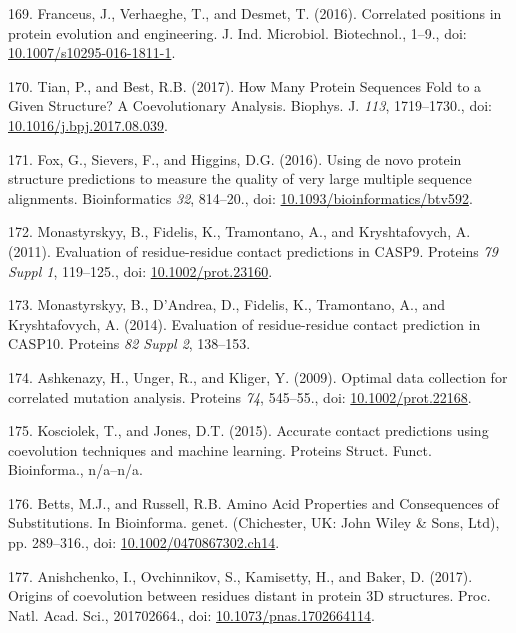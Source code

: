 \documentclass[11pt,a4paper,twoside]{book}
\theoremstyle{definition}
\theoremstyle{definition}
\theoremstyle{remark}
\begin{document}
\hypertarget{ref-Franceus2016}{}
169. Franceus, J., Verhaeghe, T., and Desmet, T. (2016). Correlated
positions in protein evolution and engineering. J. Ind. Microbiol.
Biotechnol., 1--9., doi:
\href{https://doi.org/10.1007/s10295-016-1811-1}{10.1007/s10295-016-1811-1}.

\hypertarget{ref-Tian2017}{}
170. Tian, P., and Best, R.B. (2017). How Many Protein Sequences Fold to
a Given Structure? A Coevolutionary Analysis. Biophys. J. \emph{113},
1719--1730., doi:
\href{https://doi.org/10.1016/j.bpj.2017.08.039}{10.1016/j.bpj.2017.08.039}.

\hypertarget{ref-Fox2016}{}
171. Fox, G., Sievers, F., and Higgins, D.G. (2016). Using de novo
protein structure predictions to measure the quality of very large
multiple sequence alignments. Bioinformatics \emph{32}, 814--20., doi:
\href{https://doi.org/10.1093/bioinformatics/btv592}{10.1093/bioinformatics/btv592}.

\hypertarget{ref-Monastyrskyy2011}{}
172. Monastyrskyy, B., Fidelis, K., Tramontano, A., and Kryshtafovych,
A. (2011). Evaluation of residue-residue contact predictions in CASP9.
Proteins \emph{79 Suppl 1}, 119--125., doi:
\href{https://doi.org/10.1002/prot.23160}{10.1002/prot.23160}.

\hypertarget{ref-Monastyrskyy2014a}{}
173. Monastyrskyy, B., D'Andrea, D., Fidelis, K., Tramontano, A., and
Kryshtafovych, A. (2014). Evaluation of residue-residue contact
prediction in CASP10. Proteins \emph{82 Suppl 2}, 138--153.

\hypertarget{ref-Ashkenazy2009}{}
174. Ashkenazy, H., Unger, R., and Kliger, Y. (2009). Optimal data
collection for correlated mutation analysis. Proteins \emph{74},
545--55., doi:
\href{https://doi.org/10.1002/prot.22168}{10.1002/prot.22168}.

\hypertarget{ref-Kosciolek2015a}{}
175. Kosciolek, T., and Jones, D.T. (2015). Accurate contact predictions
using coevolution techniques and machine learning. Proteins Struct.
Funct. Bioinforma., n/a--n/a.

\hypertarget{ref-Bettsa}{}
176. Betts, M.J., and Russell, R.B. Amino Acid Properties and
Consequences of Substitutions. In Bioinforma. genet. (Chichester, UK:
John Wiley \& Sons, Ltd), pp. 289--316., doi:
\href{https://doi.org/10.1002/0470867302.ch14}{10.1002/0470867302.ch14}.

\hypertarget{ref-Anishchenko2017}{}
177. Anishchenko, I., Ovchinnikov, S., Kamisetty, H., and Baker, D.
(2017). Origins of coevolution between residues distant in protein 3D
structures. Proc. Natl. Acad. Sci., 201702664., doi:
\href{https://doi.org/10.1073/pnas.1702664114}{10.1073/pnas.1702664114}.
\end{document}
